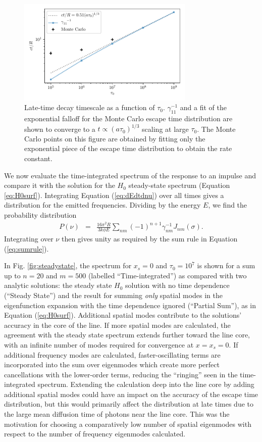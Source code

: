 \documentclass[linenumbers]{aastex63}
\newcommand{\be}{\begin{eqnarray}}
\newcommand{\ee}{\end{eqnarray}}
\begin{document}
\begin{figure}
    \centering
    \includegraphics[width=0.75\textwidth]{tau_scaling.pdf}
    \caption{Late-time decay timescale as a function of $\tau_0$. $\gamma_{11}^{-1}$ and a fit of the exponential falloff for the Monte Carlo escape time distribution are shown to converge to a $t \propto (a\tau_0)^{1/3}$ scaling at large $\tau_0$. The Monte Carlo points on this figure are obtained by fitting only the exponential piece of the escape time distribution to obtain the rate constant.}
    \label{fig:tau_scaling}
\end{figure}

We now evaluate the time-integrated spectrum of the response to an impulse and compare it with the solution for the $H_0$ steady-state spectrum (Equation \ref{eq:H0surf}). Integrating Equation (\ref{eq:dEdtdnu}) over all times gives a distribution for the emitted frequencies. Dividing by the energy $E$, we find the probability distribution
\be \label{eq:spectrum}
P(\nu) & = &  \frac{16\pi^2 R}{3k\phi E}  \sum_{nm} (-1)^{n+1} \gamma_{nm}^{-1} J_{nm}(\sigma).
\ee
Integrating over $\nu$ then gives unity as required by the sum rule in Equation (\ref{eq:sumrule}). 

In Fig. \ref{fig:steadystate}, the spectrum for $x_s=0$ and $\tau_0=10^7$ is shown for a sum up to $n=20$ and $m=500$ (labelled ``Time-integrated'') as compared with two analytic solutions: the steady state $H_0$ solution with no time dependence (``Steady State'') and the result for summing \textit{only} spatial modes in the eigenfunction expansion with the time dependence ignored (``Partial Sum''), as in Equation (\ref{eq:H0surf}). Additional spatial modes contribute to the solutions' accuracy in the core of the line. If more spatial modes are calculated, the agreement with the steady state spectrum extends further toward the line core, with an infinite number of modes required for convergence at $x=x_s=0$. If additional frequency modes are calculated, faster-oscillating terms are incorporated into the sum over eigenmodes which create more perfect cancellations with the lower-order terms, reducing the ``ringing'' seen in the time-integrated spectrum. Extending the calculation deep into the line core by adding additional spatial modes could have an impact on the accuracy of the escape time distribution, but this would primarily affect the distribution at late times due to the large mean diffusion time of photons near the line core. This was the motivation for choosing a comparatively low number of spatial eigenmodes with respect to the number of frequency eigenmodes calculated.
\end{document}
